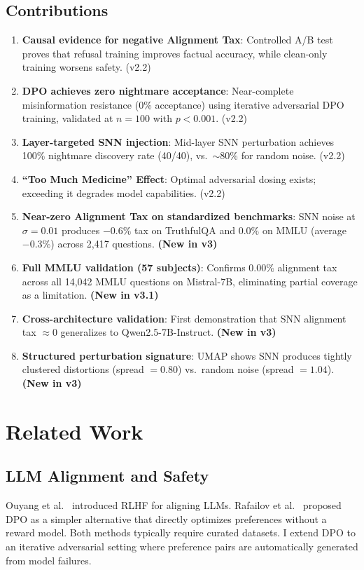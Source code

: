 \documentclass[11pt,a4paper]{article}
\begin{document}
\subsection{Contributions}
\begin{enumerate}
    \item \textbf{Causal evidence for negative Alignment Tax}: Controlled A/B test proves that refusal training improves factual accuracy, while clean-only training worsens safety. (v2.2)
    \item \textbf{DPO achieves zero nightmare acceptance}: Near-complete misinformation resistance (0\% acceptance) using iterative adversarial DPO training, validated at $n=100$ with $p < 0.001$. (v2.2)
    \item \textbf{Layer-targeted SNN injection}: Mid-layer SNN perturbation achieves 100\% nightmare discovery rate (40/40), vs.\ $\sim$80\% for random noise. (v2.2)
    \item \textbf{``Too Much Medicine'' Effect}: Optimal adversarial dosing exists; exceeding it degrades model capabilities. (v2.2)
    \item \textbf{Near-zero Alignment Tax on standardized benchmarks}: SNN noise at $\sigma=0.01$ produces $-0.6\%$ tax on TruthfulQA and $0.0\%$ on MMLU (average $-0.3\%$) across 2,417 questions. \textbf{(New in v3)}
    \item \textbf{Full MMLU validation (57 subjects)}: Confirms $0.00\%$ alignment tax across all 14,042 MMLU questions on Mistral-7B, eliminating partial coverage as a limitation. \textbf{(New in v3.1)}
    \item \textbf{Cross-architecture validation}: First demonstration that SNN alignment tax $\approx 0$ generalizes to Qwen2.5-7B-Instruct. \textbf{(New in v3)}
    \item \textbf{Structured perturbation signature}: UMAP shows SNN produces tightly clustered distortions (spread $= 0.80$) vs.\ random noise (spread $= 1.04$). \textbf{(New in v3)}
\end{enumerate}

\section{Related Work}

\subsection{LLM Alignment and Safety}
Ouyang et al.\ \cite{ouyang2022training} introduced RLHF for aligning LLMs. Rafailov et al.\ \cite{rafailov2023dpo} proposed DPO as a simpler alternative that directly optimizes preferences without a reward model. Both methods typically require curated datasets. I extend DPO to an iterative adversarial setting where preference pairs are automatically generated from model failures.
\end{document}
